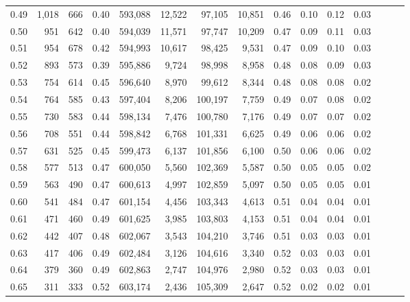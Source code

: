 \begin{tabular}{rrrrrrrrrrrrrrr}
0.49 &   1,018 &    666 &  0.40 &  593,088 &   12,522 &   97,105 &   10,851 &  0.46 &  0.10 &  0.12 &      0.03 \\
0.50 &     951 &    642 &  0.40 &  594,039 &   11,571 &   97,747 &   10,209 &  0.47 &  0.09 &  0.11 &      0.03 \\
0.51 &     954 &    678 &  0.42 &  594,993 &   10,617 &   98,425 &    9,531 &  0.47 &  0.09 &  0.10 &      0.03 \\
0.52 &     893 &    573 &  0.39 &  595,886 &    9,724 &   98,998 &    8,958 &  0.48 &  0.08 &  0.09 &      0.03 \\
0.53 &     754 &    614 &  0.45 &  596,640 &    8,970 &   99,612 &    8,344 &  0.48 &  0.08 &  0.08 &      0.02 \\
0.54 &     764 &    585 &  0.43 &  597,404 &    8,206 &  100,197 &    7,759 &  0.49 &  0.07 &  0.08 &      0.02 \\
0.55 &     730 &    583 &  0.44 &  598,134 &    7,476 &  100,780 &    7,176 &  0.49 &  0.07 &  0.07 &      0.02 \\
0.56 &     708 &    551 &  0.44 &  598,842 &    6,768 &  101,331 &    6,625 &  0.49 &  0.06 &  0.06 &      0.02 \\
0.57 &     631 &    525 &  0.45 &  599,473 &    6,137 &  101,856 &    6,100 &  0.50 &  0.06 &  0.06 &      0.02 \\
0.58 &     577 &    513 &  0.47 &  600,050 &    5,560 &  102,369 &    5,587 &  0.50 &  0.05 &  0.05 &      0.02 \\
0.59 &     563 &    490 &  0.47 &  600,613 &    4,997 &  102,859 &    5,097 &  0.50 &  0.05 &  0.05 &      0.01 \\
0.60 &     541 &    484 &  0.47 &  601,154 &    4,456 &  103,343 &    4,613 &  0.51 &  0.04 &  0.04 &      0.01 \\
0.61 &     471 &    460 &  0.49 &  601,625 &    3,985 &  103,803 &    4,153 &  0.51 &  0.04 &  0.04 &      0.01 \\
0.62 &     442 &    407 &  0.48 &  602,067 &    3,543 &  104,210 &    3,746 &  0.51 &  0.03 &  0.03 &      0.01 \\
0.63 &     417 &    406 &  0.49 &  602,484 &    3,126 &  104,616 &    3,340 &  0.52 &  0.03 &  0.03 &      0.01 \\
0.64 &     379 &    360 &  0.49 &  602,863 &    2,747 &  104,976 &    2,980 &  0.52 &  0.03 &  0.03 &      0.01 \\
0.65 &     311 &    333 &  0.52 &  603,174 &    2,436 &  105,309 &    2,647 &  0.52 &  0.02 &  0.02 &      0.01 \\

\end{tabular}
